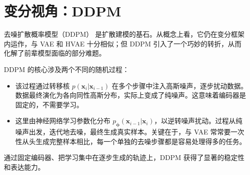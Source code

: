 \section{变分视角：DDPM}\label{sec:ddpm}

去噪扩散概率模型（DDPM）\citep{sohl2015deep,ho2020denoising} 是扩散建模的基石。从概念上看，它仍在变分框架内运作，与 VAE 和 HVAE 十分相似；但 DDPM 引入了一个巧妙的转折，从而化解了前辈模型面临的部分难题。

DDPM 的核心涉及两个不同的随机过程：
\begin{itemize}
    \item {} 该过程通过转移核 $p(\mathbf{x}_{i}|\mathbf{x}_{i-1})$ 在多个步骤中注入高斯噪声，逐步扰动数据。数据最终演化为各向同性高斯分布，实际上变成了纯噪声。这意味着编码器是固定的，不需要学习。
    \item {} 这里由神经网络学习参数化分布 $p_{\bm{\phi}}(\mathbf{x}_{i-1}|\mathbf{x}_{i})$，以逆转噪声扰动。过程从纯噪声出发，迭代地去噪，最终生成真实样本。关键在于，与 VAE 常常要一次性从头生成完整样本相比，每一个单独的去噪步骤都是容易处理得多的任务。
\end{itemize}
通过固定编码器、把学习集中在逐步生成的轨迹上，DDPM 获得了显著的稳定性和表达能力。


